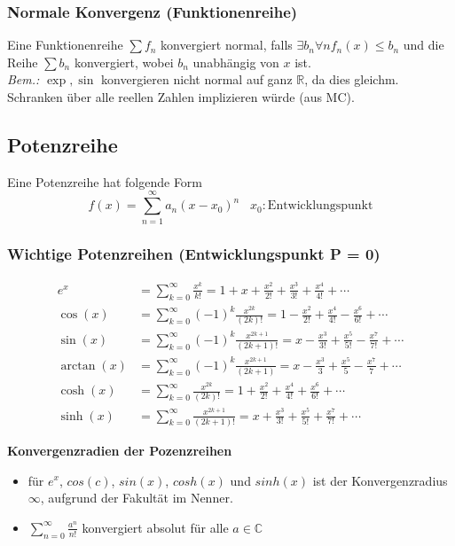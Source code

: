 \documentclass[8pt, a4paper, landscape, fleqn]{scrartcl}
\newenvironment {annotation}[1]
				{\begin{itshape} \begin{small} \textbf{#1} \begin{itemize}}
				{\end{itemize} \end{small} \end{itshape}}
\def\R{\mathbb{R}}
\def\C{\mathbb{C}}
\begin{document}
\begin{multicols*}{3}
			\subsubsection{Normale Konvergenz (Funktionenreihe)}
			    Eine Funktionenreihe $\sum f_n$ konvergiert normal, falls $\exists b_n \forall n f_n(x) \leq b_n$ und die Reihe $\sum b_n$ konvergiert, wobei $b_n$ unabhängig von $x$ ist.  \\
			    \textit{Bem.: }$\exp, \sin$ konvergieren nicht normal auf ganz $\R$, da dies gleichm. Schranken über alle reellen Zahlen implizieren würde (aus MC).
			    
			\subsection{Potenzreihe}
				Eine Potenzreihe hat folgende Form
				\[f(x)=\sum_{n=1}^{\infty}a_n(x-x_0)^n \hspace{10pt} x_0: \text{Entwicklungspunkt}\]	
				\subsubsection{Wichtige Potenzreihen (Entwicklungspunkt P = 0)}
					\vspace{-7pt}
					\begin{align*}
						e^x&= \sum_{k=0}^{\infty}\frac{x^k}{k!}=1+x+\frac{x^2}{2!}+\frac{x^3}{3!}+\frac{x^4}{4!}+\cdots\\
						\cos(x)&=\sum_{k=0}^{\infty}(-1)^k \frac{x^{2k}}{(2k)!}=1-\frac{x^2}{2!}+\frac{x^4}{4!}-\frac{x^6}{6!}+\cdots\\
						\sin(x)&=\sum_{k=0}^{\infty}(-1)^k \frac{x^{2k+1}}{(2k+1)!}=x-\frac{x^3}{3!}+\frac{x^5}{5!}-\frac{x^7}{7!}+\cdots\\
						\arctan(x)&=\sum_{k=0}^{\infty}(-1)^k \frac{x^{2k+1}}{(2k+1)}=x-\frac{x^3}{3}+\frac{x^5}{5}-\frac{x^7}{7}+\cdots\\
						\cosh(x)&=\sum_{k=0}^{\infty} \frac{x^{2k}}{(2k)!}=1+\frac{x^2}{2!}+\frac{x^4}{4!}+\frac{x^6}{6!}+\cdots\\
						\sinh(x)&=\sum_{k=0}^{\infty} \frac{x^{2k+1}}{(2k+1)!}=x+\frac{x^3}{3!}+\frac{x^5}{5!}+\frac{x^7}{7!}+\cdots
					\end{align*}

					\begin{annotation}{Konvergenzradien  der Pozenzreihen}
					    \item für $e^x$, $cos(c)$, $sin(x)$, $cosh(x)$ und $sinh(x)$ ist der Konvergenzradius $\infty$, aufgrund der Fakultät im Nenner.
					    \item $\sum_{n=0}^\infty \frac{a^n}{n!}$ konvergiert absolut für alle $a\in\C$
					\end{annotation}

\end{multicols*}
\end{document}
